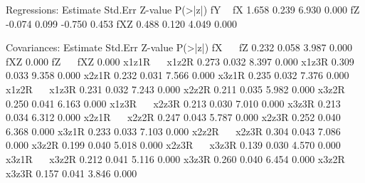 \begin{Schunk}
\begin{Soutput}
Regressions:
                   Estimate  Std.Err  Z-value  P(>|z|)
  fY ~                                                
    fX                1.658    0.239    6.930    0.000
    fZ               -0.074    0.099   -0.750    0.453
    fXZ               0.488    0.120    4.049    0.000

Covariances:
                   Estimate  Std.Err  Z-value  P(>|z|)
  fX ~~                                               
    fZ                0.232    0.058    3.987    0.000
    fXZ               0.000                           
  fZ ~~                                               
    fXZ               0.000                           
  x1z1R ~~                                            
    x1z2R             0.273    0.032    8.397    0.000
    x1z3R             0.309    0.033    9.358    0.000
    x2z1R             0.232    0.031    7.566    0.000
    x3z1R             0.235    0.032    7.376    0.000
  x1z2R ~~                                            
    x1z3R             0.231    0.032    7.243    0.000
    x2z2R             0.211    0.035    5.982    0.000
    x3z2R             0.250    0.041    6.163    0.000
  x1z3R ~~                                            
    x2z3R             0.213    0.030    7.010    0.000
    x3z3R             0.213    0.034    6.312    0.000
  x2z1R ~~                                            
    x2z2R             0.247    0.043    5.787    0.000
    x2z3R             0.252    0.040    6.368    0.000
    x3z1R             0.233    0.033    7.103    0.000
  x2z2R ~~                                            
    x2z3R             0.304    0.043    7.086    0.000
    x3z2R             0.199    0.040    5.018    0.000
  x2z3R ~~                                            
    x3z3R             0.139    0.030    4.570    0.000
  x3z1R ~~                                            
    x3z2R             0.212    0.041    5.116    0.000
    x3z3R             0.260    0.040    6.454    0.000
  x3z2R ~~                                            
    x3z3R             0.157    0.041    3.846    0.000


\end{Soutput}
\end{Schunk}
